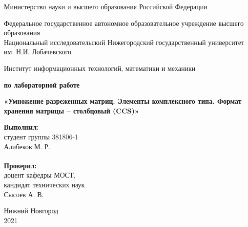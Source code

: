 \documentclass{report}
\begin{document}
	\begin{titlepage}

		\begin{center}
			Министерство науки и высшего образования Российской Федерации
		\end{center}

		\begin{center}
			Федеральное государственное автономное образовательное учреждение высшего образования \\
			Национальный исследовательский Нижегородский государственный университет им. Н.И. Лобачевского
		\end{center}

		\begin{center}
			Институт информационных технологий, математики и механики
		\end{center}

		\vspace{4em}

		\begin{center}
			\textbf{ по лабораторной работе} \\
		\end{center}
		\begin{center}
			\textbf{\Large«Умножение разреженных матриц. Элементы комплексного типа. Формат хранения матрицы – столбцовый (CCS)»} \\
		\end{center}

		\vspace{4em}

		\newbox{\lbox}
		\newlength{\maxl}
		\setlength{\maxl}{\wd\lbox}
		\hfill\parbox{7cm}{
			\hspace*{5cm}\hspace*{-5cm}\textbf{Выполнил:} \\ студент группы 381806-1 \\ Алибеков М. Р.\\
			\\
			\hspace*{5cm}\hspace*{-5cm}\textbf{Проверил:}\\ доцент кафедры МОСТ, \\ кандидат технических наук \\ Сысоев А. В.\\
		}
		\vspace{\fill}

		\begin{center} Нижний Новгород \\ 2021 \end{center}

	\end{titlepage}
\end{document}
